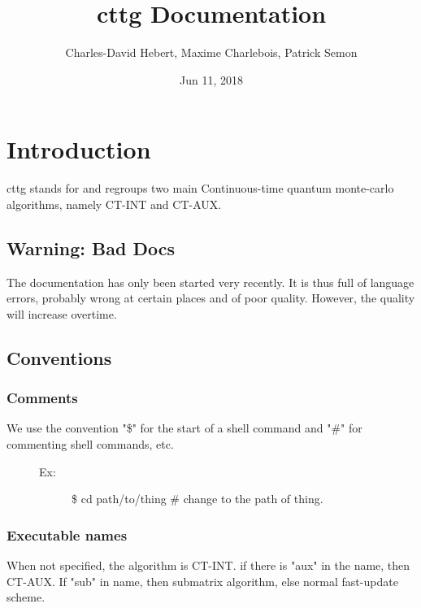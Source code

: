 \documentclass[letterpaper,10pt,english]{sphinxmanual}
\title{cttg Documentation}
\date{Jun 11, 2018}
\author{Charles-David Hebert, Maxime Charlebois, Patrick Semon}
\begin{document}
\maketitle
\sphinxtableofcontents
{}\label{\detokenize{index::doc}}



\chapter{Introduction}
\label{\detokenize{intro:introduction}}\label{\detokenize{intro:welcome-to-cttg-s-documentation}}\label{\detokenize{intro::doc}}
cttg stands for 
and regroups two main Continuous-time quantum monte-carlo algorithms, namely CT-INT and CT-AUX.


\section{Warning: Bad Docs}
\label{\detokenize{intro:warning-bad-docs}}
The documentation has only been started very recently. It is thus full of language errors, probably wrong at certain places and of poor quality.
However, the quality will increase overtime.


\section{Conventions}
\label{\detokenize{intro:conventions}}

\subsection{Comments}
\label{\detokenize{intro:comments}}\begin{description}
\item[{We use the convention "\$" for the start of a shell command and "\#" for commenting shell commands, etc.}] \leavevmode\begin{description}
\item[{Ex:}] \leavevmode
\$ cd path/to/thing    \# change to the path of thing.

\end{description}

\end{description}


\subsection{Executable names}
\label{\detokenize{intro:executable-names}}
When not specified, the algorithm is CT-INT. if there is "aux" in the name, then CT-AUX.
If "sub" in name, then submatrix algorithm, else normal fast-update scheme.
\end{document}

